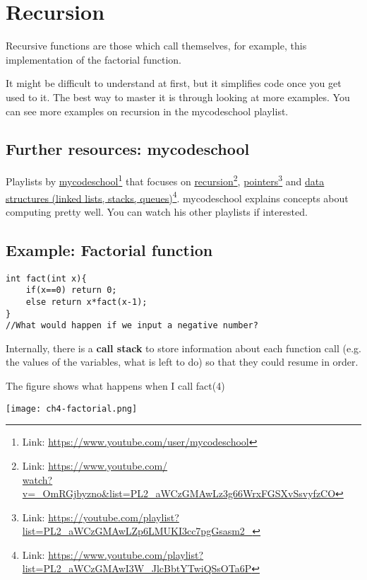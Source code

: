 \chapter{Recursion}

Recursive functions are those which call themselves, for example, this implementation of the factorial function.

It might be difficult to understand at first, but it simplifies code once you get used to it. The best way to master it is through looking at more examples. You can see more examples on recursion in the mycodeschool playlist.

\section{Further resources: mycodeschool}

Playlists by 
\href{https://www.youtube.com/user/mycodeschool}{mycodeschool}\footnote{Link: \href{https://www.youtube.com/user/mycodeschool}{https://www.youtube.com/user/mycodeschool}}
that focuses on 
\href{https://www.youtube.com/watch?v=_OmRGjbyzno&list=PL2_aWCzGMAwLz3g66WrxFGSXvSsvyfzCO}{recursion}\footnote{Link: \href{https://www.youtube.com/watch?v=_OmRGjbyzno&list=PL2_aWCzGMAwLz3g66WrxFGSXvSsvyfzCO}{https://www.youtube.com/\\watch?v=\_OmRGjbyzno\&list=PL2\_aWCzGMAwLz3g66WrxFGSXvSsvyfzCO}}, 
\href{https://youtube.com/playlist?list=PL2_aWCzGMAwLZp6LMUKI3cc7pgGsasm2_}{pointers}\footnote{Link: \href{https://youtube.com/playlist?list=PL2_aWCzGMAwLZp6LMUKI3cc7pgGsasm2_}{https://youtube.com/playlist?list=PL2\_aWCzGMAwLZp6LMUKI3cc7pgGsasm2\_}} and 
\href{https://www.youtube.com/playlist?list=PL2_aWCzGMAwI3W_JlcBbtYTwiQSsOTa6P}{data structures (linked lists, stacks, queues)}\footnote{Link: \href{https://www.youtube.com/playlist?list=PL2_aWCzGMAwI3W_JlcBbtYTwiQSsOTa6P}{https://www.youtube.com/playlist?list=PL2\_aWCzGMAwI3W\_JlcBbtYTwiQSsOTa6P}}.
mycodeschool explains concepts about computing pretty well. You can watch his other playlists if interested.

\section{Example: Factorial function}

\begin{lstlisting}
int fact(int x){
    if(x==0) return 0;
    else return x*fact(x-1);
}
//What would happen if we input a negative number?
\end{lstlisting}

Internally, there is a \textbf{call stack} to store information about each function call (e.g. the values of the variables, what is left to do) so that they could resume in order.

The figure shows what happens when I call fact(4)

\texttt{[image: ch4-factorial.png]}


